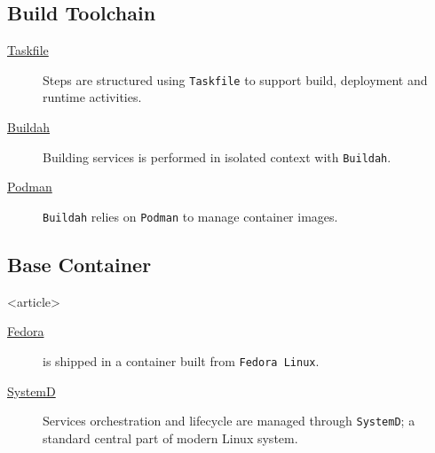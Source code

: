 \subsection{Build Toolchain}
\begin{frame}
    \begin{description}
        \item[\href{https://taskfile.dev/}{Taskfile}] Steps are structured using \texttt{Taskfile} to support build, deployment and runtime activities.
        \item[\href{https://buildah.io/}{Buildah}] Building \taoce services is performed in isolated context with \texttt{Buildah}.
        \item[\href{https://podman.io/}{Podman}] \texttt{Buildah} relies on \texttt{Podman} to manage container images.
    \end{description}
\end{frame}


\subsection<article>{Base Container}
\begin{frame}<article>
    \begin{description}
        \item[\href{https://fedoraproject.org/}{Fedora}] \taoce is shipped in a container built from \texttt{Fedora Linux}.
        \item[\href{https://systemd.io/}{SystemD}] Services orchestration and lifecycle are managed through \texttt{SystemD}; a standard central part of modern Linux system.
    \end{description}
\end{frame}

